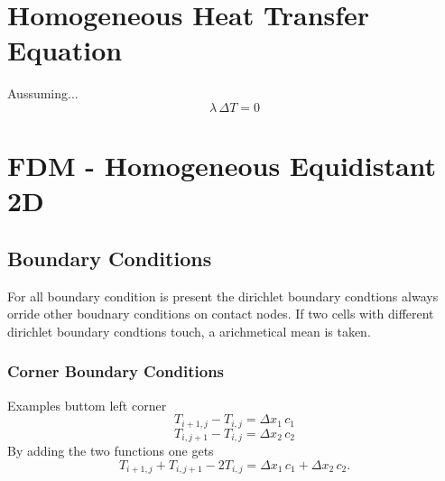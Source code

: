 \section{Homogeneous Heat Transfer Equation}
Aussuming...
\begin{equation}
\label{eqn:homogeneous_heat_transfer}
    \lambda \, \Delta T  = 0
\end{equation}

\section{FDM - Homogeneous Equidistant 2D}
\subsection{Boundary Conditions}
For all boundary condition is present the dirichlet boundary condtions always orride other boudnary conditions on contact nodes.
If two cells with different dirichlet boundary condtions touch, a arichmetical mean is taken.

\subsubsection{Corner Boundary Conditions}
Examples buttom left corner
\begin{equation}
  T_{i+1, j} - T_{i, j} = \Delta x_1 \, c_1
\end{equation}
\begin{equation}
  T_{i, j + 1} - T_{i, j} = \Delta x_2 \, c_2
\end{equation}
By adding the two functions one gets
\begin{equation}
  T_{i+1, j} + T_{i, j + 1} - 2 T_{i, j} = \Delta x_1 \, c_1 + \Delta x_2 \, c_2.
\end{equation}


